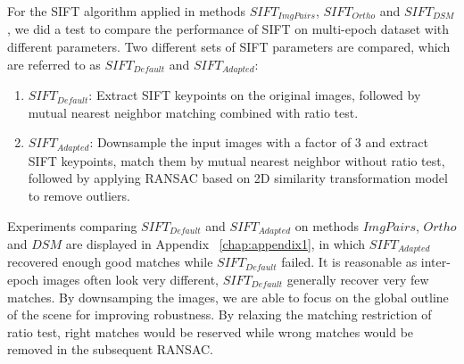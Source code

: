 For the SIFT algorithm applied in methods $SIFT_{ImgPairs}$, $SIFT_{Ortho}$ and $SIFT_{DSM}$, we did a test to compare the performance of SIFT on multi-epoch dataset with different parameters. Two different sets of SIFT parameters are compared, which are referred to as $SIFT_{Default}$ and $SIFT_{Adapted}$:\\
\begin{enumerate}
	\item \textbf{$SIFT_{Default}$}: Extract SIFT keypoints on the original images, followed by mutual nearest neighbor matching combined with ratio test.%
	\item \textbf{$SIFT_{Adapted}$}: Downsample the input images with a factor of 3 and extract SIFT keypoints, match them by mutual nearest neighbor without ratio test, followed by applying RANSAC based on 2D similarity transformation model to remove outliers.
\end{enumerate}

Experiments comparing $SIFT_{Default}$ and $SIFT_{Adapted}$ on methods ${ImgPairs}$, ${Ortho}$ and ${DSM}$ are displayed in Appendix ~\ref{chap:appendix1}, in which $SIFT_{Adapted}$ recovered enough good matches while $SIFT_{Default}$ failed. It is reasonable as inter-epoch images often look very different, $SIFT_{Default}$ generally recover very few matches. By downsamping the images, we are able to focus on the global outline of the scene for improving robustness. 
By relaxing the matching restriction of ratio test, right matches would be reserved while wrong matches would be removed in the subsequent RANSAC.\\

